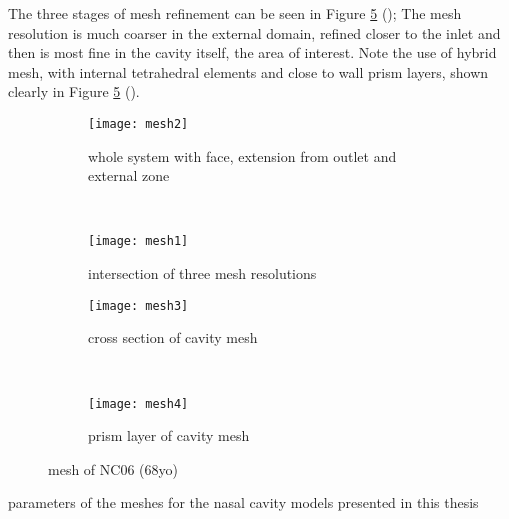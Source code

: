 The three stages of mesh refinement can be seen in Figure \ref{fig:cavme} (); The mesh resolution is much coarser in the external domain, refined closer to the inlet and then is most fine in the cavity itself, the area of interest. Note the use of hybrid mesh, with internal tetrahedral elements and close to wall prism layers, shown clearly in Figure \ref{fig:cavme} ().

\begin{figure}
  \begin{subfigure}[t]{0.5\textwidth}
    \texttt{[image: mesh2]}
    \caption{whole system with face, extension from outlet and external zone}
    \label{fig:mesh1}
  \end{subfigure}%
  ~%
  \begin{subfigure}[t]{0.5\textwidth}
    \texttt{[image: mesh1]}
    \caption{intersection of three mesh resolutions}
    \label{fig:mesh2}
  \end{subfigure}

  \begin{subfigure}[t]{0.5\textwidth}
    \texttt{[image: mesh3]}
    \caption{cross section of cavity mesh}
    \label{fig:mesh3}
  \end{subfigure}%
  ~%
  \begin{subfigure}[t]{0.5\textwidth}
    \texttt{[image: mesh4]}
    \caption{prism layer of cavity mesh}
    \label{fig:mesh4}
  \end{subfigure}
  \caption{mesh of NC06 (68yo)} \label{fig:cavme}
\end{figure}


  \begin{table} 
    \centering

  \caption{parameters of the meshes for the nasal cavity models presented in this thesis}
  \label{tab:pvv}
\end{table}
